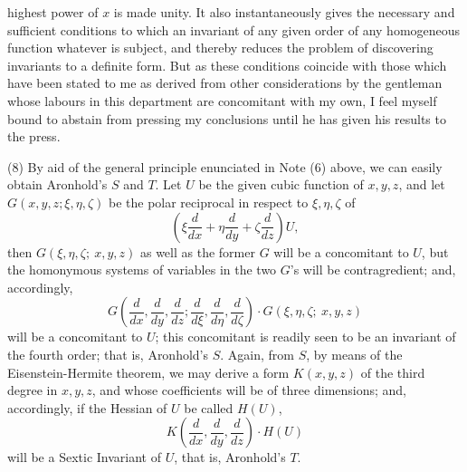 \documentclass[11pt]{article}
\newcommand{\sourcepage}[1]{\marginpar{\scriptsize p.~#1}}
\begin{document}
\sourcepage{327}
highest power of $x$ is made unity. It also instantaneously gives the necessary and sufficient conditions to which an invariant of any given order of any homogeneous function whatever is subject, and thereby reduces the problem of discovering invariants to a definite form. But as these conditions coincide with those which have been stated to me as derived from other considerations by the gentleman whose labours in this department are concomitant with my own, I feel myself bound to abstain from pressing my conclusions until he has given his results to the press.

(8) By aid of the general principle enunciated in Note (6) above, we can easily obtain Aronhold's $S$ and $T$. Let $U$ be the given cubic function of $x,y,z$, and let $G(x,y,z;\xi,\eta,\zeta)$ be the polar reciprocal in respect to $\xi,\eta,\zeta$ of
\[
\left(\xi\frac{d}{dx}+\eta\frac{d}{dy}+\zeta\frac{d}{dz}\right)U,
\]
then $G(\xi,\eta,\zeta;\ x,y,z)$ as well as the former $G$ will be a concomitant to $U$, but the homonymous systems of variables in the two $G$'s will be contragredient; and, accordingly,
\[
G\left(\frac{d}{dx},\frac{d}{dy},\frac{d}{dz};\frac{d}{d\xi},\frac{d}{d\eta},\frac{d}{d\zeta}\right)\cdot
G(\xi,\eta,\zeta;\ x,y,z)
\]
will be a concomitant to $U$; this concomitant is readily seen to be an invariant of the fourth order; that is, Aronhold's $S$. Again, from $S$, by means of the Eisenstein-Hermite theorem, we may derive a form $K(x,y,z)$ of the third degree in $x,y,z$, and whose coefficients will be of three dimensions; and, accordingly, if the Hessian of $U$ be called $H(U)$,
\[
K\left(\frac{d}{dx},\frac{d}{dy},\frac{d}{dz}\right)\cdot H(U)
\]
will be a Sextic Invariant of $U$, that is, Aronhold's $T$.
\end{document}
